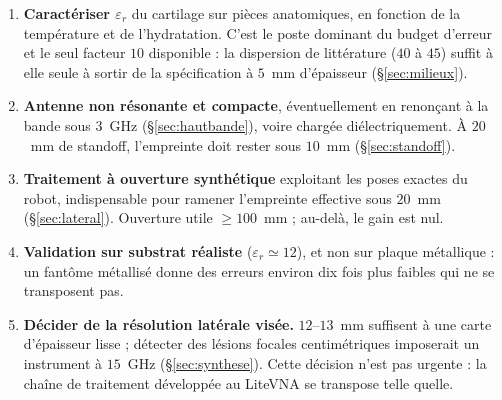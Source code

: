 \documentclass[11pt,a4paper]{article}
\newcommand{\eps}{\varepsilon_r}
\begin{document}
\begin{enumerate}
      \emph{Réserve} : la détection à deux pics n'est fiable qu'au-delà de
      $2{,}5$ largeurs de résolution, soit $80$~mm de PMMA. En deçà elle est
      biaisée de plusieurs pour cent, et sous une résolution elle retourne une
      valeur fausse mais plausible. Son désaccord avec le modèle y est donc
      \emph{attendu} et ne signale aucun défaut --- c'est le modèle seul qui
      valide le logiciel.
\item \textbf{Caractériser $\eps$} du cartilage sur pièces anatomiques, en
      fonction de la température et de l'hydratation. C'est le poste dominant du
      budget d'erreur et le seul facteur $10$ disponible : la dispersion de
      littérature ($40$ à $45$) suffit à elle seule à sortir de la
      spécification à $5$~mm d'épaisseur (\S\ref{sec:milieux}).
\item \textbf{Antenne non résonante et compacte}, éventuellement en renonçant
      à la bande sous $3$~GHz (\S\ref{sec:hautbande}), voire chargée
      diélectriquement. À $20$~mm de standoff, l'empreinte doit rester sous
      $10$~mm (\S\ref{sec:standoff}).
\item \textbf{Traitement à ouverture synthétique} exploitant les poses exactes
      du robot, indispensable pour ramener l'empreinte effective sous $20$~mm
      (\S\ref{sec:lateral}). Ouverture utile $\ge 100$~mm ; au-delà, le gain est
      nul.
\item \textbf{Validation sur substrat réaliste} ($\eps \simeq 12$), et non sur
      plaque métallique : un fantôme métallisé donne des erreurs environ dix
      fois plus faibles qui ne se transposent pas.
\item \textbf{Décider de la résolution latérale visée.} $12$--$13$~mm suffisent
      à une carte d'épaisseur lisse ; détecter des lésions focales
      centimétriques imposerait un instrument à $15$~GHz
      (\S\ref{sec:synthese}). Cette décision n'est pas urgente : la chaîne de
      traitement développée au LiteVNA se transpose telle quelle.
\end{enumerate}

\bigskip
\noindent
{}
\end{document}
